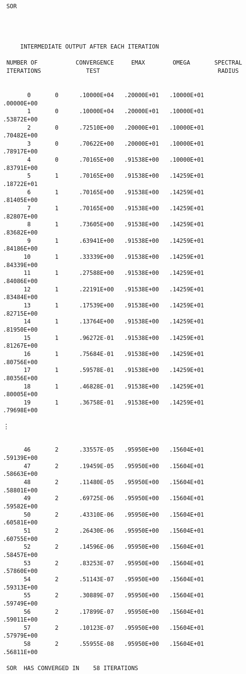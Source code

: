 \newpage
\begin{verbatim}

 SOR
 
 
 
 
     INTERMEDIATE OUTPUT AFTER EACH ITERATION
 
 NUMBER OF           CONVERGENCE     EMAX        OMEGA       SPECTRAL 
 ITERATIONS             TEST                                  RADIUS
 
 
       0       0      .10000E+04   .20000E+01   .10000E+01   .00000E+00
       1       0      .10000E+04   .20000E+01   .10000E+01   .53872E+00
       2       0      .72510E+00   .20000E+01   .10000E+01   .70482E+00
       3       0      .70622E+00   .20000E+01   .10000E+01   .78917E+00
       4       0      .70165E+00   .91538E+00   .10000E+01   .83791E+00
       5       1      .70165E+00   .91538E+00   .14259E+01   .18722E+01
       6       1      .70165E+00   .91538E+00   .14259E+01   .81405E+00
       7       1      .70165E+00   .91538E+00   .14259E+01   .82807E+00
       8       1      .73605E+00   .91538E+00   .14259E+01   .83682E+00
       9       1      .63941E+00   .91538E+00   .14259E+01   .84186E+00
      10       1      .33339E+00   .91538E+00   .14259E+01   .84339E+00
      11       1      .27588E+00   .91538E+00   .14259E+01   .84086E+00
      12       1      .22191E+00   .91538E+00   .14259E+01   .83484E+00
      13       1      .17539E+00   .91538E+00   .14259E+01   .82715E+00
      14       1      .13764E+00   .91538E+00   .14259E+01   .81950E+00
      15       1      .96272E-01   .91538E+00   .14259E+01   .81267E+00
      16       1      .75684E-01   .91538E+00   .14259E+01   .80756E+00
      17       1      .59578E-01   .91538E+00   .14259E+01   .80356E+00
      18       1      .46828E-01   .91538E+00   .14259E+01   .80005E+00
      19       1      .36758E-01   .91538E+00   .14259E+01   .79698E+00

\end{verbatim}
\hspace*{2.0in} \vdots
\begin{verbatim}

      46       2      .33557E-05   .95950E+00   .15604E+01   .59139E+00
      47       2      .19459E-05   .95950E+00   .15604E+01   .58663E+00
      48       2      .11480E-05   .95950E+00   .15604E+01   .58801E+00
      49       2      .69725E-06   .95950E+00   .15604E+01   .59582E+00
      50       2      .43310E-06   .95950E+00   .15604E+01   .60581E+00
      51       2      .26430E-06   .95950E+00   .15604E+01   .60755E+00
      52       2      .14596E-06   .95950E+00   .15604E+01   .58457E+00
      53       2      .83253E-07   .95950E+00   .15604E+01   .57860E+00
      54       2      .51143E-07   .95950E+00   .15604E+01   .59313E+00
      55       2      .30889E-07   .95950E+00   .15604E+01   .59749E+00
      56       2      .17899E-07   .95950E+00   .15604E+01   .59011E+00
      57       2      .10123E-07   .95950E+00   .15604E+01   .57979E+00
      58       2      .55955E-08   .95950E+00   .15604E+01   .56811E+00
 
 SOR  HAS CONVERGED IN    58 ITERATIONS 
\end{verbatim}
